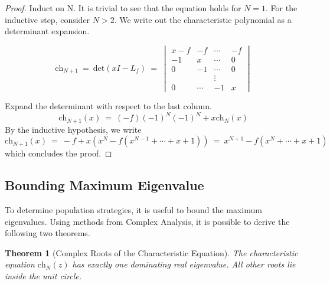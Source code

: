 \documentclass{article}
\newtheorem{theorem}{Theorem}[section]
\newtheorem{theorem}{Theorem}
\numberwithin{equation}{section}
\newcommand{\ch}{\text{ch}}
\begin{document}
\begin{proof} Induct on N. It is trivial to see that the equation holds for 
$N = 1$. For the inductive step, consider $N > 2$. We write out the 
characteristic polynomial as a determinant expansion. 

\[
    \ch_{N + 1} \ = \ \textrm{det}(xI - L_f) 
    \ = \ 
    \begin{vmatrix}
        x - f & -f& \cdots & -f \\ 
        -1 & x & \cdots & 0 \\
        0 & -1 & \cdots & 0\\
        &&\vdots &\\
        0 & \cdots & -1 & x
    \end{vmatrix} 
\]

Expand the determinant with respect to the last column. 
\[
    \ch_{N + 1}(x) \ = \ 
    (-f)(-1)^N(-1)^N + x\ch_{N}(x)
\]
By the inductive hypothesis, we write 
\[
    \ch_{N + 1}(x) \ = \ 
    -f + x\left(
    x^N - f(x^{N-1} + \cdots + x + 1)
    \right)
    \ = \ 
x^{N + 1} - f(x^{N} + \cdots + x + 1)
\]
which concludes the proof. 
\end{proof}


\subsection{Bounding Maximum Eigenvalue}
To determine population strategies, it is useful to bound the maximum eigenvalues. 
Using methods from Complex Analysis, it is possible to derive the following 
two theorems. 

\begin{theorem}[Complex Roots of the Characteristic Equation]\label{thm:compRoots}
    The characteristic equation $\ch_N(z)$ has exactly one dominating 
    real eigenvalue. All other roots lie inside the unit circle. 
\end{theorem}
\end{document}

